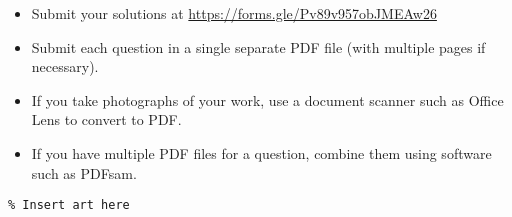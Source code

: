 \documentclass{article}
\begin{document}
\vfill
\small
\begin{itemize}
	\item Submit your solutions at \href{https://forms.gle/Pv89v957obJMEAw26}{https://forms.gle/Pv89v957obJMEAw26}
	\item Submit each question in a single separate PDF file (with multiple pages if necessary).
	\item If you take photographs of your work, use a document scanner such as Office Lens to convert to PDF.
	\item If you have multiple PDF files for a question, combine them using software such as PDFsam.
\end{itemize}

\vfill
\centering
\small
\begin{BVerbatim}
\end{BVerbatim}
\end{document}
